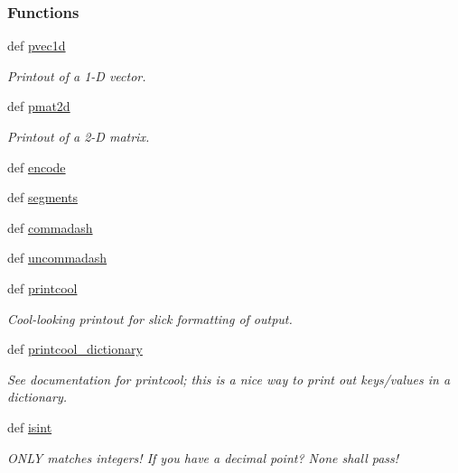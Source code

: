 \subsubsection*{Functions}
\begin{DoxyCompactItemize}
\item 
def \hyperlink{namespaceforcebalance_1_1nifty_a27e3a9dc144a5ad505509ac9ede08d7d}{pvec1d}
\begin{DoxyCompactList}\small\item\em Printout of a 1-\/\-D vector. \end{DoxyCompactList}\item 
def \hyperlink{namespaceforcebalance_1_1nifty_af61d76c8eb78c8ee52a43e239ff26cb4}{pmat2d}
\begin{DoxyCompactList}\small\item\em Printout of a 2-\/\-D matrix. \end{DoxyCompactList}\item 
def \hyperlink{namespaceforcebalance_1_1nifty_a3b437964dc22735bf8a7dcbaf99e413d}{encode}
\item 
def \hyperlink{namespaceforcebalance_1_1nifty_a3b9fd8e29c5d8f1b2114e4d9662dfd61}{segments}
\item 
def \hyperlink{namespaceforcebalance_1_1nifty_a9628ee448710667747d8aa5dc166532c}{commadash}
\item 
def \hyperlink{namespaceforcebalance_1_1nifty_afa670d68f01813ac8d429bc5cbdb4f9f}{uncommadash}
\item 
def \hyperlink{namespaceforcebalance_1_1nifty_a11babd62dc7bca389162c6318f9672ca}{printcool}
\begin{DoxyCompactList}\small\item\em Cool-\/looking printout for slick formatting of output. \end{DoxyCompactList}\item 
def \hyperlink{namespaceforcebalance_1_1nifty_a51180e960742cc7547749fdfb3513ec4}{printcool\-\_\-dictionary}
\begin{DoxyCompactList}\small\item\em See documentation for printcool; this is a nice way to print out keys/values in a dictionary. \end{DoxyCompactList}\item 
def \hyperlink{namespaceforcebalance_1_1nifty_a3f1c7a1af9d35d5d1693074bc6f5497c}{isint}
\begin{DoxyCompactList}\small\item\em O\-N\-L\-Y matches integers! If you have a decimal point? None shall pass! \end{DoxyCompactList}\item 

\end{DoxyCompactItemize}
